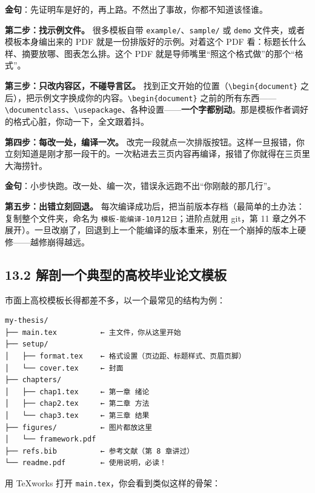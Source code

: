 \begin{notebox}
\textbf{金句}：先证明车是好的，再上路。不然出了事故，你都不知道该怪谁。
\end{notebox}

\textbf{第二步：找示例文件。} 很多模板自带 \texttt{example/}、\texttt{sample/} 或 \texttt{demo} 文件夹，或者模板本身编出来的 PDF 就是一份排版好的示例。对着这个 PDF 看：标题长什么样、摘要放哪、图表怎么排。这个 PDF 就是导师嘴里“照这个格式做”的那个“格式”。

\textbf{第三步：只改内容区，不碰导言区。} 找到正文开始的位置（\texttt{\textbackslash{}begin\{document\}} 之后），把示例文字换成你的内容。\texttt{\textbackslash{}begin\{document\}} 之前的所有东西——\texttt{\textbackslash{}documentclass}、\texttt{\textbackslash{}usepackage}、各种设置——\textbf{一个字都别动}。那是模板作者调好的格式心脏，你动一下，全文跟着抖。

\textbf{第四步：每改一处，编译一次。} 改完一段就点一次排版按钮。这样一旦报错，你立刻知道是刚才那一段干的。一次粘进去三页内容再编译，报错了你就得在三页里大海捞针。

\begin{notebox}
\textbf{金句}：小步快跑。改一处、编一次，错误永远跑不出“你刚敲的那几行”。
\end{notebox}

\textbf{第五步：出错立刻回退。} 每次编译成功后，把当前版本存档（最简单的土办法：复制整个文件夹，命名为 \texttt{模板-能编译-10月12日}；进阶点就用 git，第 11 章之外不展开）。一旦改崩了，回退到上一个能编译的版本重来，别在一个崩掉的版本上硬修——越修崩得越远。

\subsection*{13.2 解剖一个典型的高校毕业论文模板}

市面上高校模板长得都差不多，以一个最常见的结构为例：

\begin{lstlisting}
my-thesis/
├── main.tex          ← 主文件，你从这里开始
├── setup/
│   ├── format.tex    ← 格式设置（页边距、标题样式、页眉页脚）
│   └── cover.tex     ← 封面
├── chapters/
│   ├── chap1.tex     ← 第一章 绪论
│   ├── chap2.tex     ← 第二章 方法
│   └── chap3.tex     ← 第三章 结果
├── figures/          ← 图片都放这里
│   └── framework.pdf
├── refs.bib          ← 参考文献（第 8 章讲过）
└── readme.pdf        ← 使用说明，必读！
\end{lstlisting}

用 TeXworks 打开 \texttt{main.tex}，你会看到类似这样的骨架：

